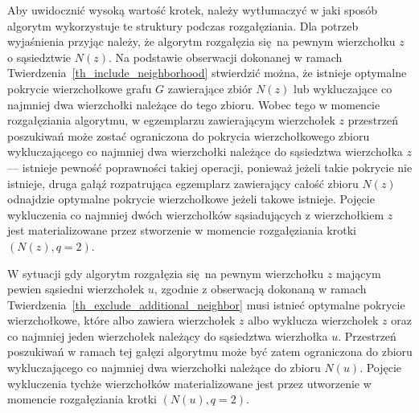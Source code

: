 \par{
  Aby uwidocznić wysoką wartość krotek, należy wytłumaczyć w jaki sposób algorytm wykorzystuje te struktury podczas rozgałęziania.
  Dla potrzeb wyjaśnienia przyjąc należy, że algorytm rozgałęzia się na pewnym wierzchołku $z$ o sąsiedztwie $N(z)$.
  Na podstawie obserwacji dokonanej w ramach Twierdzenia~\ref{th_include_neighborhood} stwierdzić można, że istnieje optymalne pokrycie wierzchołkowe grafu $G$ zawierające zbiór $N(z)$ lub wykluczające co najmniej dwa wierzchołki należące do tego zbioru.
  Wobec tego w momencie rozgałęziania algorytmu, w egzemplarzu zawierającym wierzchołek $z$ przestrzeń poszukiwań może zostać ograniczona do pokrycia wierzchołkowego zbioru wykluczającego co najmniej dwa wierzchołki należące do sąsiedztwa wierzchołka $z$ --- istnieje pewność poprawności takiej operacji, ponieważ jeżeli takie pokrycie nie istnieje, druga gałąź rozpatrująca egzemplarz zawierający całość zbioru $N(z)$ odnajdzie optymalne pokrycie wierzchołkowe jeżeli takowe istnieje.
  Pojęcie wykluczenia co najmniej dwóch wierzchołków sąsiadujących z wierzchołkiem $z$ jest materializowane przez stworzenie w momencie rozgałęziania krotki $(N(z), q=2)$.

  W sytuacji gdy algorytm rozgałęzia się na pewnym wierzchołku $z$ mającym pewien sąsiedni wierzchołek $u$, zgodnie z obserwacją dokonaną w ramach Twierdzenia~\ref{th_exclude_additional_neighbor} musi istnieć optymalne pokrycie wierzchołkowe, które albo zawiera wierzchołek $z$ albo wyklucza wierzchołek $z$ oraz co najmniej jeden wierzchołek należący do sąsiedztwa wierzhołka $u$.
  Przestrzeń poszukiwań w ramach tej gałęzi algorytmu może być zatem ograniczona do zbioru wykluczającego co najmniej dwa wierzchołki należące do zbioru $N(u)$.
  Pojęcie wykluczenia tychże wierzchołków materializowane jest przez utworzenie w momencie rozgałęziania krotki $(N(u), q=2)$.
}
